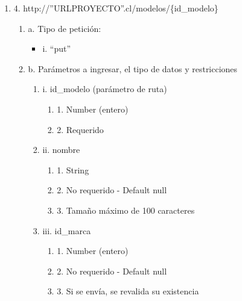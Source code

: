 \begin{enumerate}
    \item 4. http://”URLPROYECTO”.cl/modelos/\{id\_modelo\}
    \begin{enumerate}
        \item a. Tipo de petición:
            \begin{itemize}
               \item i. “put”
            \end{itemize}
        \item b. Parámetros a ingresar, el tipo de datos y restricciones
            \begin{enumerate}
                \item i. id\_modelo (parámetro de ruta)
                    \begin{enumerate}
                        \item 1. Number (entero)
                        \item 2. Requerido
                    \end{enumerate}
                \item ii. nombre
                    \begin{enumerate}
                        \item 1. String
                        \item 2. No requerido - Default null
                        \item 3. Tamaño máximo de 100 caracteres
                    \end{enumerate}
                \item iii. id\_marca
                    \begin{enumerate}
                        \item 1. Number (entero)
                        \item 2. No requerido - Default null
                        \item 3. Si se envía, se revalida su existencia
                    \end{enumerate}
            \end{enumerate}
    \end{enumerate}


\end{enumerate}
